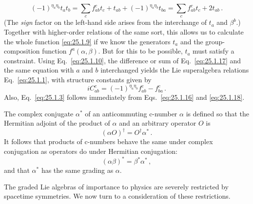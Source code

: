 \begin{equation}
  (-1)^{\eta_a\eta_b}t_at_b
  =\sum_c f^c_{ab}t_c+t_{ab}
    +(-1)^{\eta_a\eta_b}t_{ba}
  =\sum_c f^c_{ab}t_c+2t_{ab}\,.
  \tag{25.1.17}\label{eq:25.1.17}
\end{equation}
(The \emph{sign} factor on the left-hand side arises from the interchange of
$t_a$ and $\beta^b$.) Together with higher-order relations of the same sort,
this allows us to calculate the whole function \eqref{eq:25.1.9} if we know
the generators $t_a$ and the group-composition function
$f^a(\alpha,\beta)$. But for this to be possible, $t_a$ must satisfy a
constraint. Using Eq.~\eqref{eq:25.1.10}, the difference or sum of
Eq.~\eqref{eq:25.1.17} and the same equation with $a$ and $b$ interchanged
yields the Lie superalgebra relations Eq.~\eqref{eq:25.1.1}, with structure
constants given by
\begin{equation}
  iC^c_{ab}=(-1)^{\eta_a\eta_b}f^c_{ab}-f^c_{ba}\,.
  \tag{25.1.18}\label{eq:25.1.18}
\end{equation}
Also, Eq.~\eqref{eq:25.1.3} follows immediately from
Eqs.~\eqref{eq:25.1.16} and \eqref{eq:25.1.18}.

The complex conjugate $\alpha^*$ of an anticommuting c-number $\alpha$ is
defined so that the Hermitian adjoint of the product of $\alpha$ and an
arbitrary operator $O$ is
\begin{equation}
  (\alpha O)^\dagger=O^\dagger\alpha^*\,.
  \tag{25.1.19}\label{eq:25.1.19}
\end{equation}
It follows that products of c-numbers behave the same under complex
conjugation as operators do under Hermitian conjugation:
\begin{equation}
  (\alpha\beta)^*=\beta^*\alpha^*\,,
  \tag{25.1.20}\label{eq:25.1.20}
\end{equation}
and that $\alpha^*$ has the same grading as $\alpha$.

The graded Lie algebras of importance to physics are severely restricted by
spacetime symmetries. We now turn to a consideration of these restrictions.
